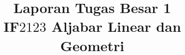 \newcommand{\fpb}[2]{\mathrm{FPB}(#1, #2)}
\newcommand{\kpk}[2]{\mathrm{KPK}(#1, #2)}

\renewcommand{\listtablename}{Daftar Tabel}
\renewcommand{\listfigurename}{Daftar Gambar}
\usepackage{hyperref}


\usepackage[backend=biber]{biblatex}
\makeatletter
\def\@biblabel#1{}
\makeatother

\renewcommand{\mod}{\mathrm{mod} \ }


\usepackage{etoolbox}
\makeatletter
\providecommand{\institute}[1]{%
  \apptocmd{\@author}{\end{tabular}
    \par
    \begin{tabular}[t]{c}
    #1}{}{}
}
\makeatother

\newcommand{\garis} [3] []{
	\begin{center}
		\begin{tikzpicture}
			\draw[#2-#3, ultra thick, #1] (0,0) to (1\linewidth,0);
		\end{tikzpicture}
	\end{center}
}

\renewcommand\today{$\number\day$\ %
	\ifcase\month \or Januari%
	\or Februari%
	\or Maret%
	\or April%
	\or Mei%
	\or Juni%
	\or Juli%
	\or Agustus%
	\or September%
	\or Oktober%
	\or November%
	\or Desember\fi\ $\number\year$}%

 \title{
\textbf{Laporan Tugas Besar 1} 
\\ IF$2123$ Aljabar Linear dan Geometri \\[5em]
}

